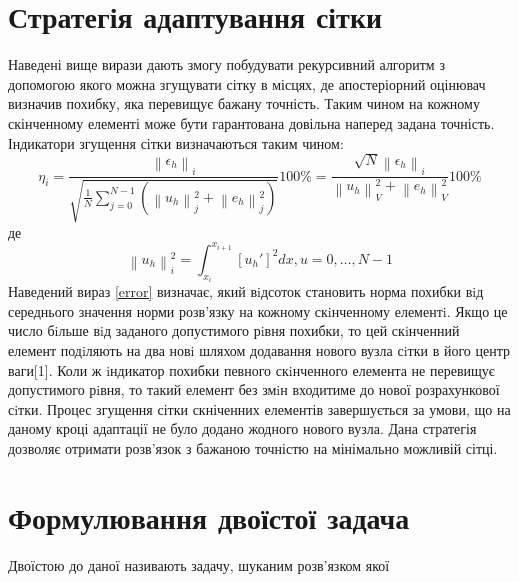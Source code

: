 \documentclass[a4paper]{article}
\newcommand\norm[1]{\left\lVert#1\right\rVert}
\numberwithin{equation}{section}
\begin{document}
\section{Стратегія адаптування сітки}
Наведені вище вирази дають змогу побудувати рекурсивний алгоритм з допомогою якого можна згущувати сітку в місцях, де апостеріорний оцінювач визначив похибку, яка перевищує бажану точність. Таким чином на кожному скінченному елементі може бути гарантована довільна наперед задана точність. Індикатори згущення сітки визначаються таким чином:
\begin{equation}\label{error}
\eta_i=\frac{\norm{\epsilon_h}_i}{\sqrt{ \frac{1}{N} \sum_{j=0}^{N-1}(\norm{u_h}_j^2 + \norm{e_h}_j^2)}}100\%=\frac{\sqrt{N}\norm{\epsilon_h}_i} {\norm{u_h}_V^2 + \norm{e_h}_V^2} 100\%
\end{equation}
де
\begin{equation}
\norm{u_h}_i^2=\int_{x_i}^{x_{i+1}}[u_h']^2dx, u=0,\ldots, N-1
\end{equation}
Наведений вираз \ref{error} визначає, який вiдсоток становить норма похибки вiд середнього значення норми розв’язку на кожному скiнченному елементi. Якщо це число бiльше вiд заданого допустимого рiвня похибки, то цей скiнченний елемент подiляють на два новi шляхом додавання нового вузла сiтки в його центр ваги[1]. Коли ж iндикатор похибки певного скiнченного елемента не перевищує допустимого рiвня, то такий елемент без змiн входитиме до нової розрахункової сiтки. Процес згущення сітки скніченних елементів завершується за умови, що на даному кроці адаптації не було додано жодного нового вузла.
Дана стратегія дозволяє отримати розв'язок з бажаною точністю на мінімально можливій сітці.

\section{Формулювання двоїстої задача}
Двоїстою до даної називають задачу, шуканим розв'язком якої
\end{document}

